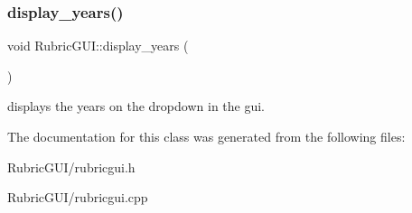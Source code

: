\subsubsection{\texorpdfstring{display\+\_\+years()}{display\_years()}}
{\footnotesize\ttfamily void Rubric\+G\+U\+I\+::display\+\_\+years (\begin{DoxyParamCaption}{ }\end{DoxyParamCaption})}

displays the years on the dropdown in the gui. 

The documentation for this class was generated from the following files\+:\begin{DoxyCompactItemize}
\item 
Rubric\+G\+U\+I/rubricgui.\+h\item 
Rubric\+G\+U\+I/rubricgui.\+cpp\end{DoxyCompactItemize}
